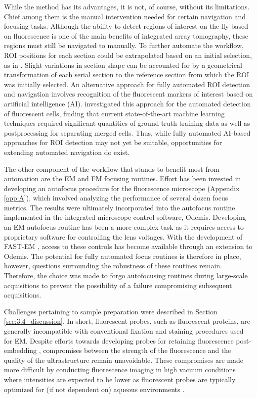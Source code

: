 While the method has its advantages, it is not, of course, without its limitations. Chief among them is the manual intervention needed for certain navigation and focusing tasks. Although the ability to detect regions of interest on-the-fly based on fluorescence is one of the main benefits of integrated array tomography, these regions must still be navigated to manually. To further automate the workflow, ROI positions for each section could be extrapolated based on an initial selection, as in \textcite{gabarre2021workflow}. Slight variations in section shape can be accounted for by a geometrical transformation of each serial section to the reference section from which the ROI was initially selected. An alternative approach for fully automated ROI detection and navigation involves recognition of the fluorescent markers of interest based on artificial intelligence (AI). \textcite{delpiano2018automated} investigated this approach for the automated detection of fluorescent cells, finding that current state-of-the-art machine learning techniques required significant quantities of ground truth training data as well as postprocessing for separating merged cells. Thus, while fully automated AI-based approaches for ROI detection may not yet be suitable, opportunities for extending automated navigation do exist.

The other component of the workflow that stands to benefit most from automation are the EM and FM focusing routines. Effort has been invested in developing an autofocus procedure for the fluorescence microscope (Appendix \ref{app:A}), which involved analyzing the performance of several dozen focus metrics. The results were ultimately incorporated into the autofocus routine implemented in the integrated microscope control software, Odemis. Developing an EM autofocus routine has been a more complex task as it requires access to proprietary software for controlling the lens voltages. With the development of FAST-EM \cite{fermie2021high}, access to these controls has become available through an extension to Odemis. The potential for fully automated focus routines is therefore in place, however, questions surrounding the robustness of these routines remain. Therefore, the choice was made to forgo autofocusing routines during large-scale acquisitions to prevent the possibility of a failure compromising subsequent acquisitions.

Challenges pertaining to sample preparation were described in Section \ref{sec:3.4_discussion}. In short, fluorescent probes, such as fluorescent proteins, are generally incompatible with conventional fixation and staining procedures used for EM. Despite efforts towards developing probes for retaining fluorescence post-embedding \cite{watanabe2011protein, kukulski2011correlated, peddie2014correlative}, compromises between the strength of the fluorescence and the quality of the ultrastructure remain unavoidable. These compromises are made more difficult by conducting fluorescence imaging in high vacuum conditions where intensities are expected to be lower as fluorescent probes are typically optimized for (if not dependent on) aqueous environments \cite{peddie2014correlative}.

